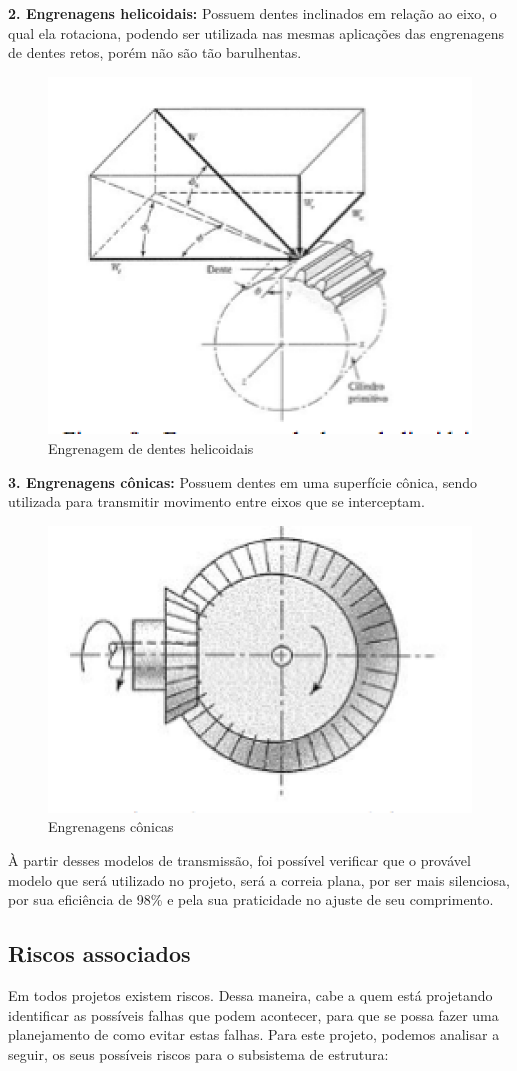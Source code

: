 \textbf{2. Engrenagens helicoidais:}
Possuem dentes inclinados em relação ao eixo, o qual ela rotaciona, podendo ser utilizada nas mesmas aplicações das engrenagens de dentes retos, porém não são tão barulhentas.
\begin{figure}[ht]
		\centering
		\includegraphics[width=.4\textwidth]{figuras/helicoidais.png}
		\caption{Engrenagem de dentes helicoidais}
		\label{fig:helicoidais}
	\end{figure}


\textbf{3. Engrenagens cônicas:}
Possuem dentes em uma superfície cônica, sendo utilizada para transmitir movimento entre eixos que se interceptam.
\begin{figure}[ht]
		\centering
		\includegraphics[width=.4\textwidth]{figuras/conica.png}
		\caption{Engrenagens cônicas }
		\label{fig:conica}
	\end{figure}

\par À partir desses modelos de transmissão, foi possível verificar que o provável modelo que será utilizado no projeto, será a correia plana, por ser mais silenciosa, por sua eficiência de 98\% e pela sua praticidade no ajuste de seu comprimento.

\subsection{Riscos associados}

Em todos projetos existem riscos. Dessa maneira, cabe a quem está projetando identificar as possíveis falhas que podem acontecer, para que se possa fazer uma planejamento de como evitar estas falhas. Para este projeto, podemos analisar a seguir, os seus possíveis riscos para o subsistema de estrutura:

